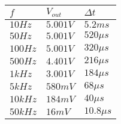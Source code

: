 \begin{tabular}{| m{5em} | m{5em} | m{5em} |}
    \hline
    $f$ & $V_{out}$ & $\Delta t$\\
    \hline
    $10Hz$ & $5.001V$ & $5.2 ms$\\
    $50Hz$ & $5.001V$ & $520 \mu s$\\
    $100Hz$ & $5.001V$ & $320 \mu s$\\
    $500Hz$ & $4.401V$ & $216 \mu s$\\
    $1kHz$ & $3.001V$ & $184\mu s$\\
    $5kHz$ & $580mV$ & $68 \mu s$\\
    $10kHz$ & $184mV$ & $40 \mu s$\\
    $50kHz$ & $16mV$ & $10.8\mu s$\\
    \hline
\end{tabular}